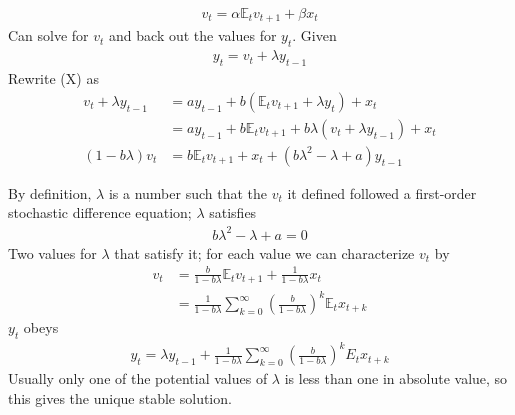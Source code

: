 \documentclass{beamer}
\begin{document}
\begin{frame}
  \begin{align}
  v_t=\alpha \mathbb{E}_tv_{t+1} + \beta x_t  
  \end{align}
  Can solve for $v_t$ and back out the values for $y_t$. 
  Given 
  \begin{align}
    y_t=v_t+\lambda y_{t-1}
  \end{align}
  Rewrite (X) as
\begin{align}
  v_t+\lambda y_{t-1} &= ay_{t-1} + b(\mathbb{E}_tv_{t+1} + \lambda y_t) + x_t\\ \nonumber
  &= ay_{t-1} + b\mathbb{E}_tv_{t+1} + b\lambda(v_t + \lambda y_{t-1}) + x_t\\ \nonumber
  (1-b\lambda)v_t &= b\mathbb{E}_tv_{t+1} + x_t + (b\lambda^2 - \lambda +a)y_{t-1}
\end{align}
\end{frame}

\begin{frame}
  By definition, $\lambda$ is a number such that the $v_t$  it defined followed a first-order stochastic difference equation; $\lambda$ satisfies 
  \begin{align}
    b\lambda^2 - \lambda + a=0
  \end{align}
Two values for $\lambda$ that satisfy it; for each value we can characterize $v_t$ by
\begin{align}
  v_t &= \frac{b}{1-b\lambda}\mathbb{E}_t v_{t+1} + \frac{1}{1-b\lambda}x_t\\
  &= \frac{1}{1-b\lambda}\sum^{\infty}_{k=0}\left(\frac{b}{1-b\lambda}\right)^k \mathbb{E}_t x_{t+k}
\end{align}
$y_t$ obeys
\begin{align}
  y_t=\lambda y_{t-1} + \frac{1}{1-b\lambda}\sum^{\infty}_{k=0}\left(\frac{b}{1-b\lambda}\right)^k E_t x_{t+k} 
\end{align}
Usually only one of the potential values of $\lambda$ is less than one in absolute value, so this gives the unique stable solution.
\end{frame}
\end{document}
